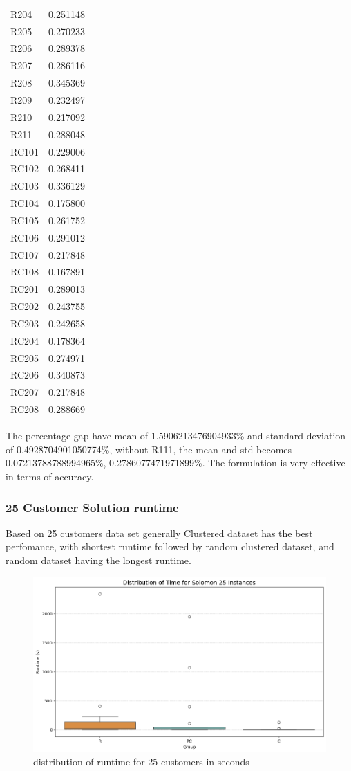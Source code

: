 \documentclass[twocolumn, 10pt]{article}
\begin{document}
\begin{table}[H]
\begin{tabular}{lr}
R204 & 0.251148 \\
R205 & 0.270233 \\
R206 & 0.289378 \\
R207 & 0.286116 \\
R208 & 0.345369 \\
R209 & 0.232497 \\
R210 & 0.217092 \\
R211 & 0.288048 \\
RC101 & 0.229006 \\
RC102 & 0.268411 \\
RC103 & 0.336129 \\
RC104 & 0.175800 \\
RC105 & 0.261752 \\
RC106 & 0.291012 \\
RC107 & 0.217848 \\
RC108 & 0.167891 \\
RC201 & 0.289013 \\
RC202 & 0.243755 \\
RC203 & 0.242658 \\
RC204 & 0.178364 \\
RC205 & 0.274971 \\
RC206 & 0.340873 \\
RC207 & 0.217848 \\
RC208 & 0.288669 \\
\bottomrule
\end{tabular}
\end{table}
The percentage gap have mean of 1.5906213476904933\% and standard deviation of 0.4928704901050774\%, without R111,
the mean and std becomes 0.07213788788994965\%, 0.2786077471971899\%. The formulation is very effective in terms of accuracy.

\subsubsection*{25 Customer Solution runtime}
Based on 25 customers data set generally Clustered dataset has the best perfomance, with shortest runtime followed by random clustered dataset, and random dataset having the longest runtime.
\begin{figure}[H]
    \centering
    \includegraphics[width=\linewidth]{figures/25_dist.png}
    \caption{distribution of runtime for 25 customers in seconds}
    \label{fig:variable_growth}
\end{figure}
\end{document}
